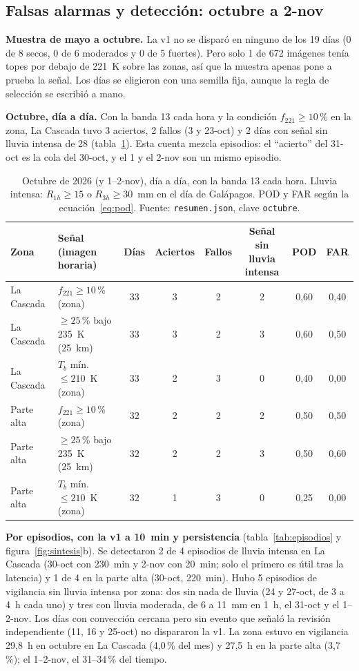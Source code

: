 \documentclass{sosg-informe}
\begin{document}
\subsection{Falsas alarmas y detección: octubre a 2-nov}
\textbf{Muestra de mayo a octubre.} La v1 no se disparó en ninguno de los 19 días (0 de 8 secos, 0 de 6 moderados y 0 de 5 fuertes). Pero solo 1 de 672 imágenes tenía topes por debajo de 221~K sobre las zonas, así que la muestra apenas pone a prueba la señal. Los días se eligieron con una semilla fija, aunque la regla de selección se escribió a mano.

\textbf{Octubre, día a día.} Con la banda 13 cada hora y la condición $f_{221} \geq 10$\,\% en la zona, La Cascada tuvo 3 aciertos, 2 fallos (3 y 23-oct) y 2 días con señal sin lluvia intensa de 28 (tabla~\ref{tab:octubre}). Esta cuenta mezcla episodios: el \enquote{acierto} del 31-oct es la cola del 30-oct, y el 1 y el 2-nov son un mismo episodio.

\begin{table}[ht]
  \centering\small
  \caption{Octubre de 2026 (y 1--2-nov), día a día, con la banda 13 cada hora. Lluvia intensa: $R_{1h} \geq 15$ o $R_{3h} \geq 30$~mm en el día de Galápagos. POD y FAR según la ecuación~\ref{eq:pod}. Fuente: \texttt{resumen.json}, clave \texttt{octubre}.}
  \label{tab:octubre}
  \begin{tabular}{llcccccc}
    \toprule
    Zona & Señal (imagen horaria) & Días & Aciertos & Fallos & \makecell{Señal sin\\lluvia intensa} & POD & FAR \\
    \midrule
    La Cascada & $f_{221} \geq 10$\,\% (zona) & 33 & 3 & 2 & 2 & 0,60 & 0,40 \\
    La Cascada & $\geq 25$\,\% bajo 235~K (25~km) & 33 & 3 & 2 & 3 & 0,60 & 0,50 \\
    La Cascada & $T_b$ mín. $\leq 210$~K (zona) & 33 & 2 & 3 & 0 & 0,40 & 0,00 \\
    Parte alta & $f_{221} \geq 10$\,\% (zona) & 32 & 2 & 2 & 2 & 0,50 & 0,50 \\
    Parte alta & $\geq 25$\,\% bajo 235~K (25~km) & 32 & 2 & 2 & 3 & 0,50 & 0,60 \\
    Parte alta & $T_b$ mín. $\leq 210$~K (zona) & 32 & 1 & 3 & 0 & 0,25 & 0,00 \\
    \bottomrule
  \end{tabular}
\end{table}

\textbf{Por episodios, con la v1 a 10~min y persistencia} (tabla~\ref{tab:episodios} y figura~\ref{fig:sintesis}b). Se detectaron 2 de 4 episodios de lluvia intensa en La Cascada (30-oct con 230~min y 2-nov con 20~min; solo el primero es útil tras la latencia) y 1 de 4 en la parte alta (30-oct, 220~min). Hubo 5 episodios de vigilancia sin lluvia intensa por zona: dos sin nada de lluvia (24 y 27-oct, de 3 a 4~h cada uno) y tres con lluvia moderada, de 6 a 11~mm en 1~h, el 31-oct y el 1--2-nov. Los días con convección cercana pero sin evento que señaló la revisión independiente (11, 16 y 25-oct) no dispararon la v1. La zona estuvo en vigilancia 29,8~h en octubre en La Cascada (4,0\,\% del mes) y 27,5~h en la parte alta (3,7\,\%); el 1--2-nov, el 31--34\,\% del tiempo.
\end{document}

